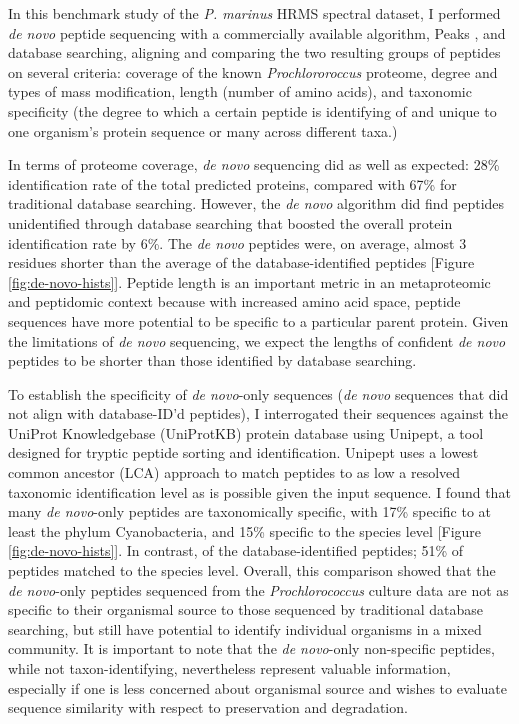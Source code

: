 \documentclass[12pt, letterpaper, twoside]{article}
\begin{document}
In this benchmark study of the \textit{P. marinus} HRMS spectral dataset, I performed \textit{de novo} peptide sequencing with a commercially available algorithm, Peaks \cite{ma_peaks:_2003}, and database searching, aligning and comparing the two resulting groups of peptides on several criteria: coverage of the known \textit{Prochlororoccus} proteome, degree and types of mass modification, length (number of amino acids), and taxonomic specificity (the degree to which a certain peptide is identifying of and unique to one organism's protein sequence or many across different taxa.)

In terms of proteome coverage, \textit{de novo} sequencing did as well as expected: 28\% identification rate of the total predicted proteins, compared with 67\% for traditional database searching. However, the \textit{de novo} algorithm did find peptides unidentified through database searching that boosted the overall protein identification rate by 6\%. The \textit{de novo} peptides were, on average, almost 3 residues shorter than the average of the database-identified peptides [Figure \ref{fig:de-novo-hists}]. Peptide length is an important metric in an metaproteomic and peptidomic context because with increased amino acid space, peptide sequences have more potential to be specific to a particular parent protein. Given the limitations of \textit{de novo} sequencing, we expect the lengths of confident \textit{de novo} peptides to be shorter than those identified by database searching. 

To establish the specificity of \textit{de novo}-only sequences (\textit{de novo} sequences that did not align with database-ID'd peptides), I interrogated their sequences against the UniProt Knowledgebase (UniProtKB) protein database using Unipept, a tool designed for tryptic peptide sorting and identification. Unipept uses a lowest common ancestor (LCA) approach to match peptides to as low a resolved taxonomic identification level as is possible given the input sequence. I found that many \textit{de novo}-only peptides are taxonomically specific, with 17\% specific to at least the phylum Cyanobacteria, and 15\% specific to the species level [Figure \ref{fig:de-novo-hists}]. In contrast, of the database-identified peptides; 51\% of peptides matched to the species level. Overall, this comparison showed that the \textit{de novo}-only peptides sequenced from the \textit{Prochlorococcus} culture data are not as specific to their organismal source to those sequenced by traditional database searching, but still have potential to identify individual organisms in a mixed community.  It is important to note that the \textit{de novo}-only non-specific peptides, while not taxon-identifying, nevertheless represent valuable information, especially if one is less concerned about organismal source and wishes to evaluate sequence similarity with respect to preservation and degradation.  
\end{document}
